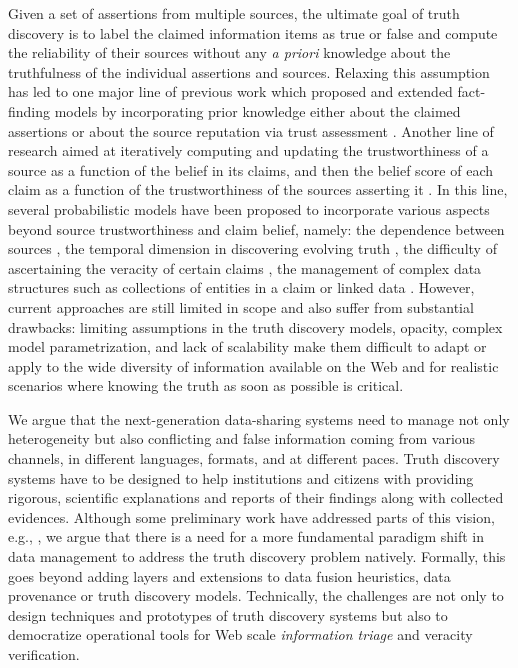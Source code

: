 \documentclass[prodmode,acmtecs]{acmsmall} %
\begin{document}
Given a set of assertions from multiple sources, the ultimate goal of truth discovery is to label the claimed
information items as true or false and compute the reliability of their sources without any {\it a priori} knowledge
about the truthfulness of the individual assertions and sources. Relaxing this assumption has led to one major line of
previous work which proposed and extended fact-finding 
models by incorporating prior knowledge either about the claimed assertions \cite{PasternackR13} or about the source 
reputation via trust assessment \cite{BalakrishnanK11}. Another line of research aimed at iteratively computing 
and updating the trustworthiness of a source as a function of the belief in its claims, and then the belief score of each 
claim as a function of the trustworthiness of the 
sources asserting it \cite{YinHY08}. In this line, several probabilistic models have been proposed to incorporate various aspects beyond source 
trustworthiness and claim belief, namely: the dependence between sources \cite{DongBHS10a}, the temporal 
dimension in discovering evolving truth  \cite{DongBS09a}, the difficulty of ascertaining the veracity of certain claims \cite{GallandAMS10}, 
the management of complex  data structures such as collections of entities in a claim \cite{ZhaoRGH12} or linked data \cite{GoasdoueKKLMZ13}.
 However, current approaches are still limited in scope and also suffer from substantial drawbacks: limiting  
 assumptions in the truth discovery models, opacity, complex model parametrization, and lack of scalability  make them difficult to adapt or apply to the 
 wide diversity of information available on the Web and for realistic scenarios where knowing the truth as soon as possible is critical. 




 We argue that the next-generation data-sharing systems need to manage not only heterogeneity but also conflicting and false 
 information  coming from various channels, in different languages, formats, and at different paces. Truth discovery systems  have to be designed to help institutions and citizens with providing rigorous, scientific explanations and reports 
 of their findings along with collected evidences. %
  Although some preliminary work have addressed parts of this vision, e.g., \cite{DongS2013,DongBHS10a,LiDLMS12}, we argue that there is a need for a more fundamental paradigm shift in data management  to address the truth discovery problem natively. Formally, this goes beyond adding layers and extensions to data fusion heuristics, data provenance or truth discovery models. Technically, the challenges are not only to  design techniques and prototypes of truth discovery systems but also to democratize operational tools for Web scale {\it information  triage} and veracity verification.
  
\end{document}
